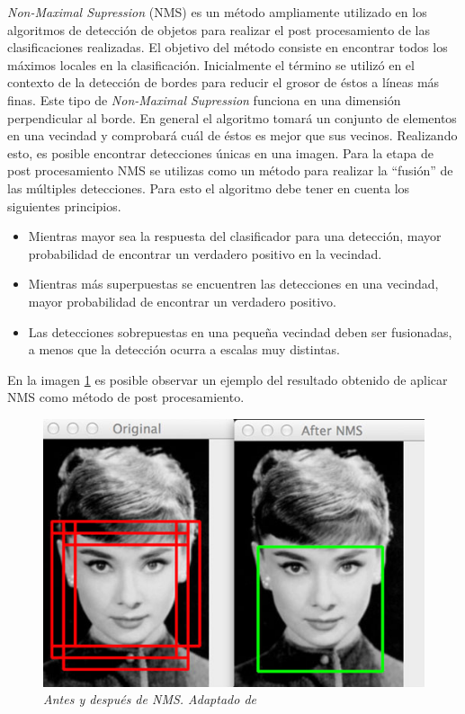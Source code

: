 \textit{Non-Maximal Supression} (NMS) es un método ampliamente utilizado en los algoritmos de detección de objetos para realizar el post procesamiento de las clasificaciones realizadas. El objetivo del método consiste en encontrar todos los máximos locales en la clasificación. Inicialmente el término se utilizó en el contexto de la detección de bordes para reducir el grosor de éstos a líneas más finas. Este tipo de \textit{Non-Maximal Supression} funciona en una dimensión perpendicular al borde. 
En general el algoritmo tomará un conjunto de elementos en una vecindad y comprobará cuál de éstos es mejor que sus vecinos. Realizando esto, es posible encontrar detecciones únicas en una imagen. Para la etapa de post procesamiento NMS se utilizas como un método para realizar la ``fusión'' de las múltiples detecciones. Para esto el algoritmo debe tener en cuenta los siguientes principios.

\begin{itemize}
\item Mientras mayor sea la respuesta del clasificador para una detección, mayor probabilidad de encontrar un verdadero positivo en la vecindad.
\item Mientras más superpuestas se encuentren las detecciones en una vecindad, mayor probabilidad de encontrar un verdadero positivo.
\item Las detecciones sobrepuestas en una pequeña vecindad deben ser fusionadas, a menos que la detección ocurra a escalas muy distintas.
\end{itemize}

En la imagen \ref{fig:nms} es posible observar un ejemplo del resultado obtenido de aplicar NMS como método de post procesamiento.

\begin{figure}[H]
  \centering
  \includegraphics[scale=.3]{images/nms}
  \caption{\em Antes y después de NMS. Adaptado de \cite{Rosebrock2014}} 
  \label{fig:nms}
\end{figure}


